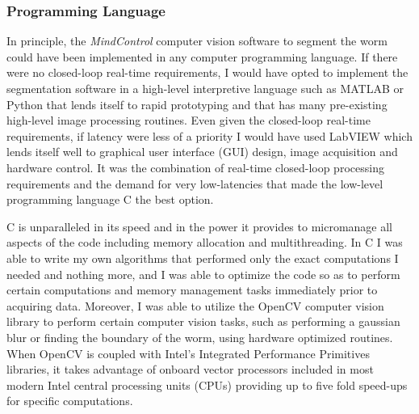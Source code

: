 \subsubsection{Programming Language}
In principle, the \emph{MindControl} computer vision software to segment the worm could have been implemented in any computer programming language. If there were no closed-loop real-time requirements, I would have opted to implement the segmentation software in a high-level interpretive language such as MATLAB or Python that lends itself to rapid prototyping and that has many pre-existing high-level image processing routines.                                                                                                                                                                                                                                                                                                                                                                                                                                                                                                                                                                                                                                                                                                                                                                                                                                                                                                                                                                                                                                                                                                                                                                                                                                                                                          Even given the closed-loop real-time requirements, if latency were less of a priority I would have used LabVIEW which lends itself well to graphical user interface (GUI) design, image acquisition and hardware control. It was the combination of real-time closed-loop processing requirements and the demand for very low-latencies that made the low-level programming language C the best option. 

C is unparalleled in its speed and in the power it provides to micromanage all aspects of the code including memory allocation and multithreading. In C I was able to write my own algorithms that performed only the exact computations I needed and nothing more, and I was able to optimize the code so as to perform certain computations and memory management tasks immediately prior to acquiring data. Moreover, I was able to utilize the OpenCV computer vision library \citep{bradski_opencv_2000,bradski_learning_2008} to perform certain computer vision tasks, such as performing a gaussian blur or finding the boundary of the worm, using hardware optimized routines. When OpenCV is coupled with Intel's Integrated Performance Primitives libraries, it takes advantage of onboard vector processors included in most modern Intel central processing units (CPUs) providing up to five fold speed-ups for specific computations. 

